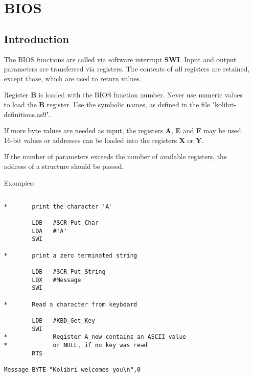\chapter{BIOS}

\section{Introduction}

The BIOS functions are called via software interrupt {\bf SWI}.
Input and output parameters are transferred via registers.
The contents of all registers are retained, except those,
which are used to return values.

Register {\bf B} is loaded with the BIOS function number.
Never use numeric values to load the {\bf B} register.
Use the symbolic names, as defined in the file
"kolibri-definitions.as9".

If more byte values are needed as input, the registers
{\bf A}, {\bf E} and {\bf F} may be used.
16-bit values or addresses can be loaded into the registers
{\bf X} or {\bf Y}.

If the number of parameters exceeds the number of available
registers, the address of a structure should be passed.

Examples:
\begin{verbatim}

*       print the character 'A'

        LDB   #SCR_Put_Char
        LDA   #'A'
        SWI

*       print a zero terminated string

        LDB   #SCR_Put_String
        LDX   #Message
        SWI

*       Read a character from keyboard

        LDB   #KBD_Get_Key
        SWI
*             Register A now contains an ASCII value
*             or NULL, if no key was read
        RTS

Message BYTE "Kolibri welcomes you\n",0

\end{verbatim}

